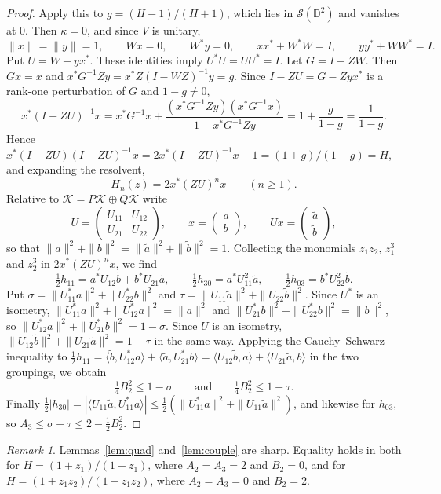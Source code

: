 \documentclass[11pt]{amsart}
\theoremstyle{remark}
\newtheorem{remark}[theorem]{Remark}
\numberwithin{equation}{section}
\newcommand{\D}{\mathbb{D}}
\begin{document}
\begin{proof}
Apply this to $g=(H-1)/(H+1)$, which lies in $\mathcal S(\D^2)$ and vanishes at $0$. Then $\kappa=0$, and since $V$ is unitary,
\[
\|x\|=\|y\|=1,\qquad Wx=0,\qquad W^*y=0,\qquad xx^*+W^*W=I,\qquad yy^*+WW^*=I.
\]
Put $U=W+yx^*$. These identities imply $U^*U=UU^*=I$. Let $G=I-ZW$. Then $Gx=x$ and $x^*G^{-1}Zy=x^*Z(I-WZ)^{-1}y=g$. Since $I-ZU=G-Zyx^*$ is a rank-one perturbation of $G$ and $1-g\ne0$,
\[
x^*(I-ZU)^{-1}x=x^*G^{-1}x+\frac{(x^*G^{-1}Zy)(x^*G^{-1}x)}{1-x^*G^{-1}Zy}=1+\frac{g}{1-g}=\frac1{1-g}.
\]
Hence $x^*(I+ZU)(I-ZU)^{-1}x=2x^*(I-ZU)^{-1}x-1=(1+g)/(1-g)=H$, and expanding the resolvent,
\[
H_n(z)=2x^*(ZU)^nx\qquad(n\ge1).
\]
Relative to $\mathcal K=P\mathcal K\oplus Q\mathcal K$ write
\[
U=\begin{pmatrix}U_{11}&U_{12}\\U_{21}&U_{22}\end{pmatrix},\qquad x=\begin{pmatrix}a\\b\end{pmatrix},\qquad Ux=\begin{pmatrix}\tilde a\\\tilde b\end{pmatrix},
\]
so that $\|a\|^2+\|b\|^2=\|\tilde a\|^2+\|\tilde b\|^2=1$. Collecting the monomials $z_1z_2$, $z_1^3$ and $z_2^3$ in $2x^*(ZU)^nx$, we find
\[
\tfrac12h_{11}=a^*U_{12}\tilde b+b^*U_{21}\tilde a,\qquad\tfrac12h_{30}=a^*U_{11}^2\tilde a,\qquad\tfrac12h_{03}=b^*U_{22}^2\tilde b.
\]
Put $\sigma=\|U_{11}^*a\|^2+\|U_{22}^*b\|^2$ and $\tau=\|U_{11}\tilde a\|^2+\|U_{22}\tilde b\|^2$. Since $U^*$ is an isometry, $\|U_{11}^*a\|^2+\|U_{12}^*a\|^2=\|a\|^2$ and $\|U_{21}^*b\|^2+\|U_{22}^*b\|^2=\|b\|^2$, so $\|U_{12}^*a\|^2+\|U_{21}^*b\|^2=1-\sigma$. Since $U$ is an isometry, $\|U_{12}\tilde b\|^2+\|U_{21}\tilde a\|^2=1-\tau$ in the same way. Applying the Cauchy--Schwarz inequality to $\tfrac12h_{11}=\langle\tilde b,U_{12}^*a\rangle+\langle\tilde a,U_{21}^*b\rangle=\langle U_{12}\tilde b,a\rangle+\langle U_{21}\tilde a,b\rangle$ in the two groupings, we obtain
\[
\tfrac14B_2^2\le1-\sigma\qquad\text{and}\qquad\tfrac14B_2^2\le1-\tau.
\]
Finally $\tfrac12|h_{30}|=|\langle U_{11}\tilde a,U_{11}^*a\rangle|\le\tfrac12(\|U_{11}^*a\|^2+\|U_{11}\tilde a\|^2)$, and likewise for $h_{03}$, so $A_3\le\sigma+\tau\le2-\tfrac12B_2^2$.
\end{proof}

\begin{remark}
Lemmas~\ref{lem:quad} and~\ref{lem:couple} are sharp. Equality holds in both for $H=(1+z_1)/(1-z_1)$, where $A_2=A_3=2$ and $B_2=0$, and for $H=(1+z_1z_2)/(1-z_1z_2)$, where $A_2=A_3=0$ and $B_2=2$.
\end{remark}
\end{document}
